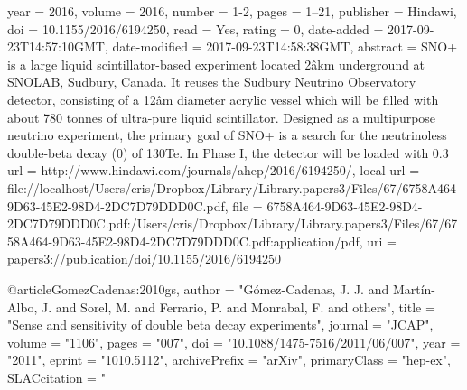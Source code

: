 {{year = {2016},
volume = {2016},
number = {1-2},
pages = {1--21},
publisher = {Hindawi},
doi = {10.1155/2016/6194250},
read = {Yes},
rating = {0},
date-added = {2017-09-23T14:57:10GMT},
date-modified = {2017-09-23T14:58:38GMT},
abstract = {SNO+ is a large liquid scintillator-based experiment located 2âkm underground at SNOLAB, Sudbury, Canada. It reuses the Sudbury Neutrino Observatory detector, consisting of a 12âm diameter acrylic vessel which will be filled with about 780 tonnes of ultra-pure liquid scintillator. Designed as a multipurpose neutrino experiment, the primary goal of SNO+ is a search for the neutrinoless double-beta decay (0) of 130Te. In Phase I, the detector will be loaded with 0.3%
url = {http://www.hindawi.com/journals/ahep/2016/6194250/},
local-url = {file://localhost/Users/cris/Dropbox/Library/Library.papers3/Files/67/6758A464-9D63-45E2-98D4-2DC7D79DDD0C.pdf},
file = {{6758A464-9D63-45E2-98D4-2DC7D79DDD0C.pdf:/Users/cris/Dropbox/Library/Library.papers3/Files/67/6758A464-9D63-45E2-98D4-2DC7D79DDD0C.pdf:application/pdf}},
uri = {\url{papers3://publication/doi/10.1155/2016/6194250}}
}

@article{GomezCadenas:2010gs,
      author         = "G\'omez-Cadenas, J. J. and Mart\'in-Albo, J. and Sorel, M. and
                        Ferrario, P. and Monrabal, F. and others",
      title          = "{Sense and sensitivity of double beta decay experiments}",
      journal        = "JCAP",
      volume         = "1106",
      pages          = "007",
      doi            = "10.1088/1475-7516/2011/06/007",
      year           = "2011",
      eprint         = "1010.5112",
      archivePrefix  = "arXiv",
      primaryClass   = "hep-ex",
      SLACcitation   = "%
}

}}
